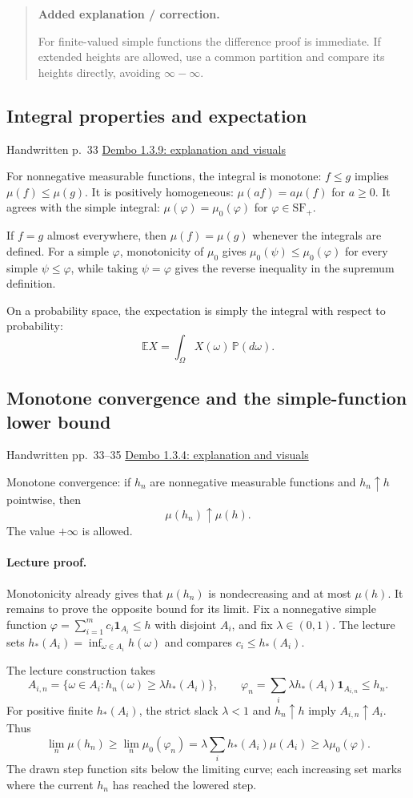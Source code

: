\documentclass[11pt,letterpaper]{article}
\newcommand{\lecturesection}[1]{\subsection{#1}}
\begin{document}
\begin{quote}\small\textbf{Added explanation / correction.}

For finite-valued simple functions the difference proof is immediate. If extended heights are allowed, use a common partition and compare its heights directly, avoiding $\infty-\infty$.
\end{quote}

\hypertarget{l4-s7}{}
\lecturesection{Integral properties and expectation}
{\small\textcolor{lectureink}{Handwritten p.\ 33} \quad \href{https://josephrbailey.com/probability/\#entry-1-3-9}{Dembo 1.3.9: explanation and visuals}}

For nonnegative measurable functions, the integral is monotone: $f\le g$ implies $\mu(f)\le\mu(g)$. It is positively homogeneous: $\mu(af)=a\mu(f)$ for $a\ge0$. It agrees with the simple integral: $\mu(\varphi)=\mu_0(\varphi)$ for $\varphi\in\mathrm{SF}_+$.

If $f=g$ almost everywhere, then $\mu(f)=\mu(g)$ whenever the integrals are defined. For a simple $\varphi$, monotonicity of $\mu_0$ gives $\mu_0(\psi)\le\mu_0(\varphi)$ for every simple $\psi\le\varphi$, while taking $\psi=\varphi$ gives the reverse inequality in the supremum definition.

On a probability space, the expectation is simply the integral with respect to probability: \[\mathbb E X=\int_\Omega X(\omega)\,\mathbb P(d\omega).\]

\hypertarget{l4-s8}{}
\lecturesection{Monotone convergence and the simple-function lower bound}
{\small\textcolor{lectureink}{Handwritten pp.\ 33--35} \quad \href{https://josephrbailey.com/probability/\#entry-1-3-4}{Dembo 1.3.4: explanation and visuals}}

Monotone convergence: if $h_n$ are nonnegative measurable functions and $h_n\uparrow h$ pointwise, then \[\mu(h_n)\uparrow\mu(h).\] The value $+\infty$ is allowed.

\paragraph{Lecture proof.}
Monotonicity already gives that $\mu(h_n)$ is nondecreasing and at most $\mu(h)$. It remains to prove the opposite bound for its limit. Fix a nonnegative simple function $\varphi=\sum_{i=1}^{m}c_i\mathbf1_{A_i}\le h$ with disjoint $A_i$, and fix $\lambda\in(0,1)$. The lecture sets $h_*(A_i)=\inf_{\omega\in A_i}h(\omega)$ and compares $c_i\le h_*(A_i)$.

The lecture construction takes \[A_{i,n}=\{\omega\in A_i:h_n(\omega)\ge\lambda h_*(A_i)\},\qquad \varphi_n=\sum_i\lambda h_*(A_i)\mathbf1_{A_{i,n}}\le h_n.\] For positive finite $h_*(A_i)$, the strict slack $\lambda<1$ and $h_n\uparrow h$ imply $A_{i,n}\uparrow A_i$. Thus \[\lim_n\mu(h_n)\ge\lim_n\mu_0(\varphi_n)=\lambda\sum_i h_*(A_i)\mu(A_i)\ge\lambda\mu_0(\varphi).\] The drawn step function sits below the limiting curve; each increasing set marks where the current $h_n$ has reached the lowered step.
\end{document}
